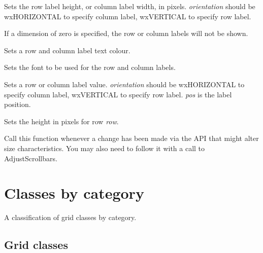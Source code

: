 
Sets the row label height, or column label width, in pixels. {\it orientation} should
be wxHORIZONTAL to specify column label, wxVERTICAL to specify row label.

If a dimension of zero is specified, the row or column labels will not be
shown.



Sets a row and column label text colour.



Sets the font to be used for the row and column labels.



Sets a row or column label value. {\it orientation} should
be wxHORIZONTAL to specify column label, wxVERTICAL to specify row label.\rtfsp
{\it pos} is the label position.



Sets the height in pixels for row {\it row}.



Call this function whenever a change has been made via the API that
might alter size characteristics. You may also need to follow it with
a call to AdjustScrollbars.


\chapter{Classes by category}\label{classesbycat}

A classification of grid classes by category.

\section{Grid classes}

